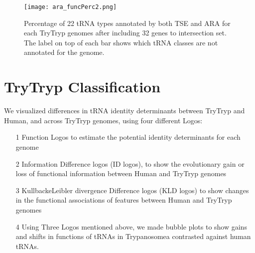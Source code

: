 \documentclass[
10pt, %
a4paper, %
oneside, %
headinclude,footinclude, %
BCOR5mm, %
]{scrartcl}
\begin{document}
\begin{figure}[tb]
\centering 
\texttt{[image: ara\_funcPerc2.png]} 
\caption[Genome Comparison]{Percentage of 22 tRNA types annotated by both TSE and ARA for each TryTryp genomes after including 32 genes to intersection set. The label on top of each bar shows which tRNA classes are not annotated for the genome.} %
\label{fig:typesimproved} 
\end{figure}

\section{TryTryp Classification}


We visualized differences in tRNA identity determinants between TryTryp and Human, and across TryTryp genomes, using four different Logos: 
\begin{enumerate}[noitemsep]

\item[1] Function Logos to estimate the potential identity determinants for each genome 
\item[2] Information Difference logos (ID logos), to show the evolutionary gain or loss of functional information between Human and TryTryp genomes 
\item[3] KullbackeLeibler divergence Difference logos (KLD logos) to show changes in the functional associations of features between Human and TryTryp genomes
\item[4] Using Three Logos mentioned above, we made bubble plots to show gains and shifts in functions of tRNAs in Trypanosomea contrasted against human tRNAs.

\end{enumerate}
\end{document}
